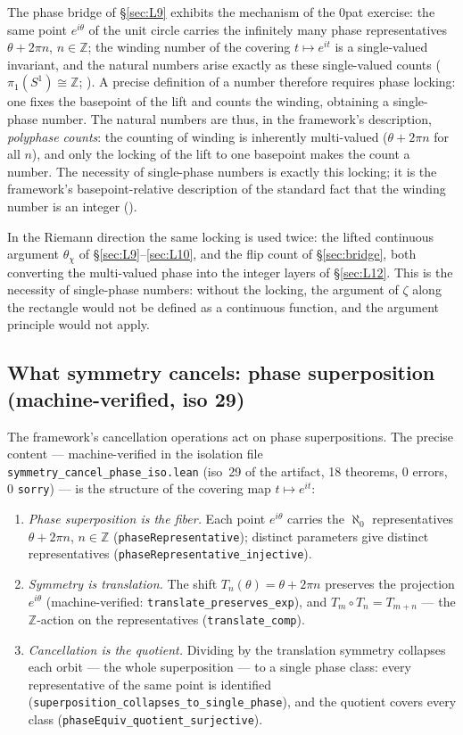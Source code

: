 \documentclass{article}
\newcommand{\Z}{\mathbb{Z}}
\newcommand{\zt}{\zeta}
\newcommand{\Xchi}{\chi}
\begin{document}
The phase bridge of \S\ref{sec:L9} exhibits the mechanism of the 0pat
exercise: the same point $e^{i\theta}$ of the unit circle carries the
infinitely many phase representatives $\theta+2\pi n$, $n\in\Z$; the winding
number of the covering $t\mapsto e^{it}$ is a single-valued invariant, and
the natural numbers arise exactly as these single-valued counts
($\pi_1(S^1)\cong\Z$; \cite{hatcher}). A precise definition of a number
therefore requires phase locking: one fixes the basepoint of the lift and
counts the winding, obtaining a single-phase number. The natural numbers
are thus, in the framework's description, \emph{polyphase counts}: the
counting of winding is inherently multi-valued ($\theta+2\pi n$ for all
$n$), and only the locking of the lift to one basepoint makes the count a
number. The necessity of single-phase numbers is exactly this locking; it
is the framework's basepoint-relative description of the standard fact
that the winding number is an integer (\cite{patbase}).

In the Riemann direction the same locking is used twice: the lifted
continuous argument $\theta_\Xchi$ of \S\ref{sec:L9}--\ref{sec:L10}, and
the flip count of \S\ref{sec:bridge}, both converting the multi-valued
phase into the integer layers of \S\ref{sec:L12}. This is the necessity of
single-phase numbers: without the locking, the argument of $\zt$ along the
rectangle would not be defined as a continuous function, and the argument
principle would not apply.

\subsection*{What symmetry cancels: phase superposition (machine-verified, iso 29)}

The framework's cancellation operations act on phase superpositions. The
precise content --- machine-verified in the isolation file
\texttt{symmetry\_cancel\_phase\_iso.lean} (iso~29 of the artifact, 18
theorems, 0 errors, 0 \texttt{sorry}) --- is the structure of the
covering map $t\mapsto e^{it}$:

\begin{enumerate}
\item \emph{Phase superposition is the fiber.} Each point $e^{i\theta}$
carries the $\aleph_0$ representatives $\theta+2\pi n$, $n\in\mathbb Z$
(\texttt{phaseRepresentative}); distinct parameters give distinct
representatives (\texttt{phaseRepresentative\_injective}).
\item \emph{Symmetry is translation.} The shift
$T_n(\theta)=\theta+2\pi n$ preserves the projection $e^{i\theta}$
(machine-verified: \texttt{translate\_preserves\_exp}), and
$T_m\circ T_n=T_{m+n}$ --- the $\mathbb Z$-action on the representatives
(\texttt{translate\_comp}).
\item \emph{Cancellation is the quotient.} Dividing by the translation
symmetry collapses each orbit --- the whole superposition --- to a single
phase class: every representative of the same point is identified
(\texttt{superposition\_collapses\_to\_single\_phase}), and the quotient
covers every class (\texttt{phaseEquiv\_quotient\_surjective}).
\end{enumerate}
\end{document}
